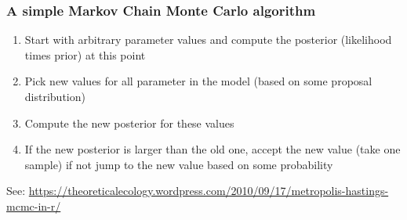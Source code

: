 \documentclass{beamer}
\begin{document}
 \begin{frame}
  \frametitle{\bf A simple Markov Chain Monte Carlo algorithm}
  
  \begin{enumerate}
   \item Start with arbitrary parameter values and compute the posterior (likelihood times prior) at this point
   \item Pick new values for all parameter in the model (based on some proposal distribution)
   \item Compute the new posterior for these values
   \item If the new posterior is larger than the old one, accept the new value (take one sample) if not jump to the new value based on some probability
  \end{enumerate}

  See: \url{https://theoreticalecology.wordpress.com/2010/09/17/metropolis-hastings-mcmc-in-r/} 
  
  
 \end{frame}
 
\end{document}

